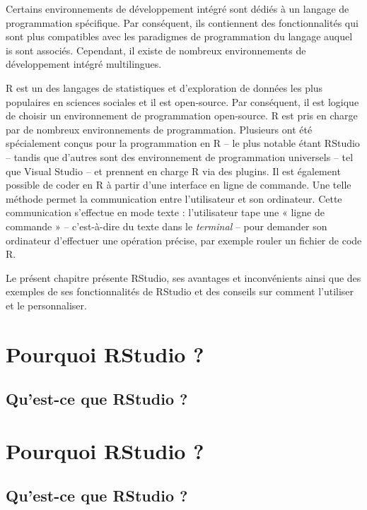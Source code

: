 \documentclass[
  letterpaper,
]{scrbook}
\begin{document}
Certains environnements de développement intégré sont dédiés à un
langage de programmation spécifique. Par conséquent, ils contiennent des
fonctionnalités qui sont plus compatibles avec les paradigmes de
programmation du langage auquel is sont associés. Cependant, il existe
de nombreux environnements de développement intégré multilingues.

R est un des langages de statistiques et d'exploration de données les
plus populaires en sciences sociales et il est open-source. Par
conséquent, il est logique de choisir un environnement de programmation
open-source. R est pris en charge par de nombreux environnements de
programmation. Plusieurs ont été spécialement conçus pour la
programmation en R -- le plus notable étant RStudio -- tandis que
d'autres sont des environnement de programmation universels -- tel que
Visual Studio -- et prennent en charge R via des plugins. Il est
également possible de coder en R à partir d'une interface en ligne de
commande. Une telle méthode permet la communication entre l'utilisateur
et son ordinateur. Cette communication s'effectue en mode texte :
l'utilisateur tape une « ligne de commande » -- c'est-à-dire du texte
dans le \emph{terminal} -- pour demander son ordinateur d'effectuer une
opération précise, par exemple rouler un fichier de code R.

Le présent chapitre présente RStudio, ses avantages et inconvénients
ainsi que des exemples de ses fonctionnalités de RStudio et des conseils
sur comment l'utiliser et le personnaliser.

\hypertarget{pourquoi-rstudio}{%
\section{Pourquoi RStudio ?}\label{pourquoi-rstudio}}

\hypertarget{quest-ce-que-rstudio}{%
\subsection{Qu'est-ce que RStudio ?}\label{quest-ce-que-rstudio}}

\hypertarget{pourquoi-rstudio-1}{%
\section{Pourquoi RStudio ?}\label{pourquoi-rstudio-1}}

\hypertarget{quest-ce-que-rstudio-1}{%
\subsection{Qu'est-ce que RStudio ?}\label{quest-ce-que-rstudio-1}}
\end{document}
